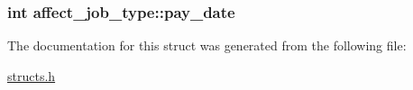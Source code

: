 \hypertarget{structaffect__job__type_a209da486a69582e12db8acd4e0446f39}{
\subsubsection[{pay\-\_\-date}]{\setlength{\rightskip}{0pt plus 5cm}int affect\-\_\-job\-\_\-type\-::pay\-\_\-date}}\label{structaffect__job__type_a209da486a69582e12db8acd4e0446f39}


The documentation for this struct was generated from the following file\-:\begin{DoxyCompactItemize}
\item 
\hyperlink{structs_8h}{structs.\-h}\end{DoxyCompactItemize}

